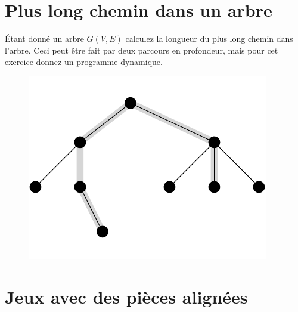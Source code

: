 \documentclass[12pt]{article}
\begin{document}


\section{Plus long chemin dans un arbre}

Étant donné un arbre $G(V,E)$ calculez la longueur du plus long chemin dans l'arbre.  Ceci peut être fait par deux parcours en profondeur, mais pour cet exercice donnez un programme dynamique.

\begin{figure}[h]
\centerline{\includegraphics{chemin_arbre}}
\end{figure}

\newpage

\section{Jeux avec des pièces alignées}
\end{document}

